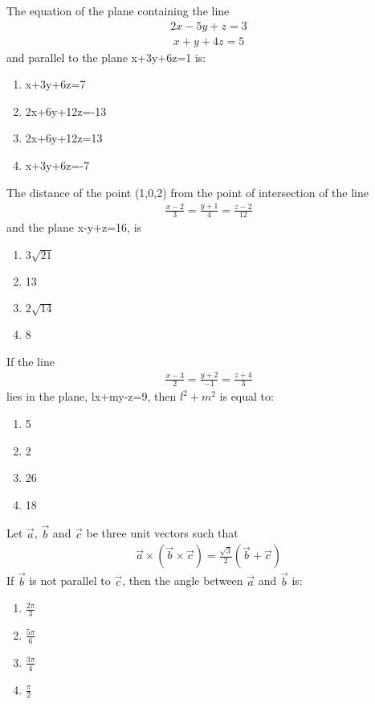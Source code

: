 \item The equation of the plane containing the line
\begin{align*}
2x-5y+z=3
\end{align*}
\begin{align*}
x+y+4z=5
\end{align*}
and parallel to the plane x+3y+6z=1 is:
\begin{enumerate}
\item x+3y+6z=7
\item 2x+6y+12z=-13
\item 2x+6y+12z=13
\item x+3y+6z=-7
\end{enumerate}

\item The distance of the point (1,0,2) from the point of intersection of the line 
\begin{align*}
\frac{x-2}{3}=\frac{y+1}{4}=\frac{z-2}{12}
\end{align*}
and the plane x-y+z=16, is
\begin{enumerate}
\item $3\sqrt{21}$
\item 13
\item $2\sqrt{14}$
\item 8
\end{enumerate}

\item If the line 
\begin{align*}
\frac{x-3}{2}=\frac{y+2}{-1}=\frac{z+4}{3}
\end{align*}
lies in the plane, lx+my-z=9, then $l^2+m^2$ is equal to:
\begin{enumerate}
\item 5
\item 2
\item 26
\item 18
\end{enumerate}

\item Let $\overrightarrow{a}$, $\overrightarrow{b}$ and $\overrightarrow{c}$ be three unit vectors such that
\begin{align*}
\overrightarrow{a} \times (\overrightarrow{b} \times \overrightarrow{c})=\frac{\sqrt{3}}{2}(\overrightarrow{b}+\overrightarrow{c})
\end{align*}
If $\overrightarrow{b}$ is not parallel to $\overrightarrow{c}$, then the angle between $\overrightarrow{a}$ and $\overrightarrow{b}$ is:
\begin{enumerate}
\item $\frac{2\pi}{3}$
\item $\frac{5\pi}{6}$
\item $\frac{3\pi}{4}$
\item $\frac{\pi}{2}$
\end{enumerate}

